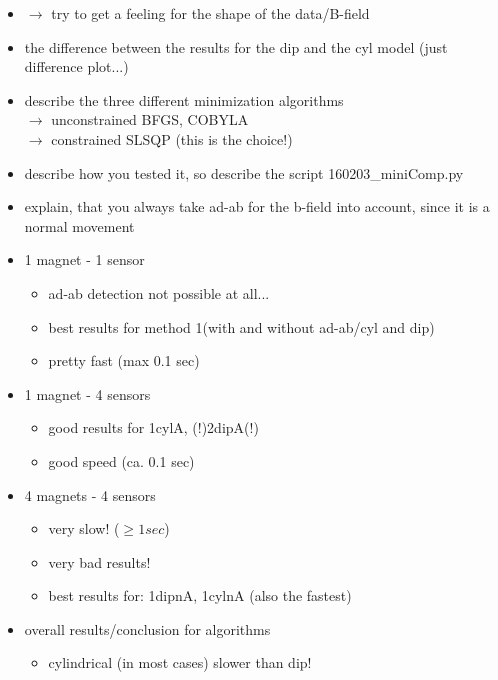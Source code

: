 \begin{itemize}
\item $ \rightarrow $ try to get a feeling for the shape of the data/B-field
\item the difference between the results for the dip and the cyl model (just difference plot...)

\item describe the three different minimization algorithms \\
	$ \rightarrow $ unconstrained BFGS, COBYLA\\
	$ \rightarrow $ constrained SLSQP (this is the choice!)
	
\item describe how you tested it, so describe the script 160203\_miniComp.py
\item explain, that you always take ad-ab for the b-field into account, since it is a normal movement

\item 1 magnet - 1 sensor
	\begin{itemize}
	\item ad-ab detection not possible at all...
	\item best results for method 1(with and without ad-ab/cyl and dip)
	\item pretty fast (max 0.1 sec)
	\end{itemize}
\item 1 magnet - 4 sensors
	\begin{itemize}
	\item good results for 1cylA, (!)2dipA(!) 
	\item good speed (ca. 0.1 sec)
	\end{itemize}
\item 4 magnets - 4 sensors
	\begin{itemize}
	\item very slow! ($ \geq 1sec $)
	\item very bad results!
	\item best results for: 1dipnA, 1cylnA (also the fastest)
	\end{itemize}
	
\item overall results/conclusion for algorithms
	\begin{itemize}
	\item cylindrical (in most cases) slower than dip!
	\end{itemize}	
		

\end{itemize}
